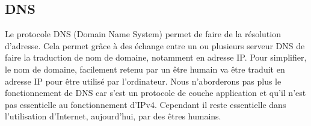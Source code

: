 \subsection{DNS}
Le protocole DNS (Domain Name System) permet de faire de la résolution
d'adresse.  Cela permet grâce à des échange entre un ou plusieurs serveur DNS
de faire la traduction de nom de domaine, notamment en adresse IP. Pour
simplifier, le nom de domaine, facilement retenu par un être humain va être
traduit en adresse IP pour être utilisé par l'ordinateur.  Nous n'aborderons
pas plus le fonctionnement de DNS car s'est un protocole de couche application
et qu'il n'est pas essentielle au fonctionnement d'IPv4. Cependant il reste
essentielle dans l'utilisation d'Internet, aujourd'hui, par des êtres humains.
